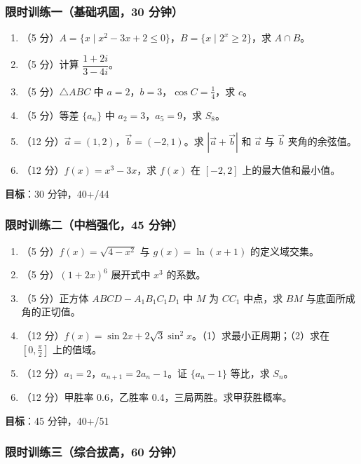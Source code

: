 \subsubsection{限时训练一（基础巩固，30 分钟）}

\begin{enumerate}
  \item（5 分）$A=\{x\mid x^2-3x+2\le0\}$，$B=\{x\mid 2^x\ge2\}$，求 $A\cap B$。
  \item（5 分）计算 $\dfrac{1+2i}{3-4i}$。
  \item（5 分）$\triangle ABC$ 中 $a=2$，$b=3$，$\cos C=\frac14$，求 $c$。
  \item（5 分）等差 $\{a_n\}$ 中 $a_2=3$，$a_5=9$，求 $S_8$。
  \item（12 分）$\vec{a}=(1,2)$，$\vec{b}=(-2,1)$。求 $|\vec{a}+\vec{b}|$ 和 $\vec{a}$ 与 $\vec{b}$ 夹角的余弦值。
  \item（12 分）$f(x)=x^3-3x$，求 $f(x)$ 在 $[-2,2]$ 上的最大值和最小值。
\end{enumerate}

\textbf{目标}：30 分钟，40+/44

\subsubsection{限时训练二（中档强化，45 分钟）}

\begin{enumerate}
  \item（5 分）$f(x)=\sqrt{4-x^2}$ 与 $g(x)=\ln(x+1)$ 的定义域交集。
  \item（5 分）$(1+2x)^6$ 展开式中 $x^3$ 的系数。
  \item（5 分）正方体 $ABCD-A_1B_1C_1D_1$ 中 $M$ 为 $CC_1$ 中点，求 $BM$ 与底面所成角的正切值。
  \item（12 分）$f(x)=\sin2x+2\sqrt3\sin^2x$。（1）求最小正周期；（2）求在 $[0,\frac{\pi}{2}]$ 上的值域。
  \item（12 分）$a_1=2$，$a_{n+1}=2a_n-1$。证 $\{a_n-1\}$ 等比，求 $S_n$。
  \item（12 分）甲胜率 0.6，乙胜率 0.4，三局两胜。求甲获胜概率。
\end{enumerate}

\textbf{目标}：45 分钟，40+/51

\subsubsection{限时训练三（综合拔高，60 分钟）}

